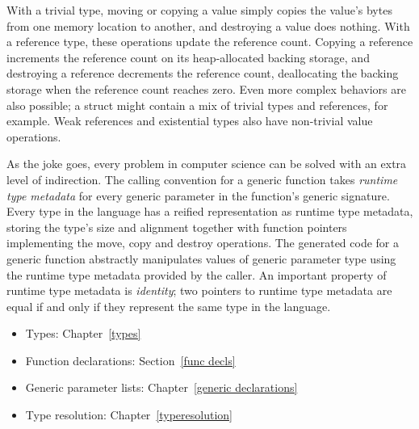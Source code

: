 \documentclass[a4paper,headsepline,bibliography=totoc,toc=flat,fleqn,twoside=semi]{scrbook}
\theoremstyle{definition}
\theoremstyle{definition}
\theoremstyle{definition}
\begin{document}
With a trivial type, moving or copying a value simply copies the value's bytes from one memory location to another, and destroying a value does nothing. With a reference type, these operations update the reference count. Copying a reference increments the reference count on its heap-allocated backing storage, and destroying a reference decrements the reference count, deallocating the backing storage when the reference count reaches zero. Even more complex behaviors are also possible; a struct might contain a mix of trivial types and references, for example. Weak references and existential types also have non-trivial value operations.

As the joke goes, every problem in computer science can be solved with an extra level of indirection. The calling convention for a generic function takes \emph{runtime type metadata} for every generic parameter in the function's generic signature. Every type in the language has a reified representation as runtime type metadata, storing the type's size and alignment together with function pointers implementing the move, copy and destroy operations. The generated code for a generic function abstractly manipulates values of generic parameter type using the runtime type metadata provided by the caller. An important property of runtime type metadata is \emph{identity}; two pointers to runtime type metadata are equal if and only if they represent the same type in the language.

\newenvironment{MoreDetails}{\medskip\begin{mdframed}[rightline=true,frametitlerule=true,frametitlerulecolor=gray,frametitlebackgroundcolor=light-gray,frametitlerulewidth=2pt,backgroundcolor=light-gray,linecolor=gray,frametitle={More details}]
\begin{itemize}}{\end{itemize}
\end{mdframed}}


\begin{MoreDetails}
\item Types: Chapter~\ref{types}
\item Function declarations: Section~\ref{func decls}
\item Generic parameter lists: Chapter~\ref{generic declarations}
\item Type resolution: Chapter~\ref{typeresolution}
\end{MoreDetails}
\end{document}
